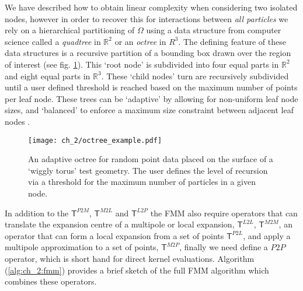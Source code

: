 We have described how to obtain linear complexity when considering two isolated nodes, however in order to recover this for interactions between \textit{all particles}  we rely on a hierarchical partitioning of $\Omega$ using a data structure from computer science called a \textit{quadtree} in $\mathbb{R}^2$ or an \textit{octree} in $\textit{R}^3$. The defining feature of these data structures is a recursive partition of a bounding box drawn over the region of interest (see fig. \ref{fig:ch_2:octree_example}). This ‘root node’ is subdivided into four equal parts in $\mathbb{R}^2$ and eight equal parts in $\mathbb{R}^3$. These ‘child nodes’ turn are recursively subdivided until a user defined threshold is reached based on the maximum number of points per leaf node. These trees can be `adaptive' by allowing for non-uniform leaf node sizes, and `balanced' to enforce a maximum size constraint between adjacent leaf nodes \cite{sundar2008bottom}.

\begin{figure}
    \centering
    \texttt{[image: ch\_2/octree\_example.pdf]}
    \caption{An adaptive octree for random point data placed on the surface of a `wiggly torus' test geometry. The user defines the level of recursion via a threshold for the maximum number of particles in a given node.}
    \label{fig:ch_2:octree_example}
\end{figure}

In addition to the $\mathsf{T}^{P2M}$, $\mathsf{T}^{M2L}$ and $\mathsf{T}^{L2P}$ the FMM also require operators that can translate the expansion centre of a multipole or local expansion, $\mathsf{T}^{L2L}$, $\mathsf{T}^{M2M}$, an operator that can form a local expansion from a set of points $\mathsf{T}^{P2L}$, and apply a multipole approximation to a set of points, $\mathsf{T}^{M2P}$, finally we need define a $P2P$ operator, which is short hand for direct kernel evaluations. Algorithm (\ref{alg:ch_2:fmm}) provides a brief sketch of the full FMM algorithm which combines these operators.

